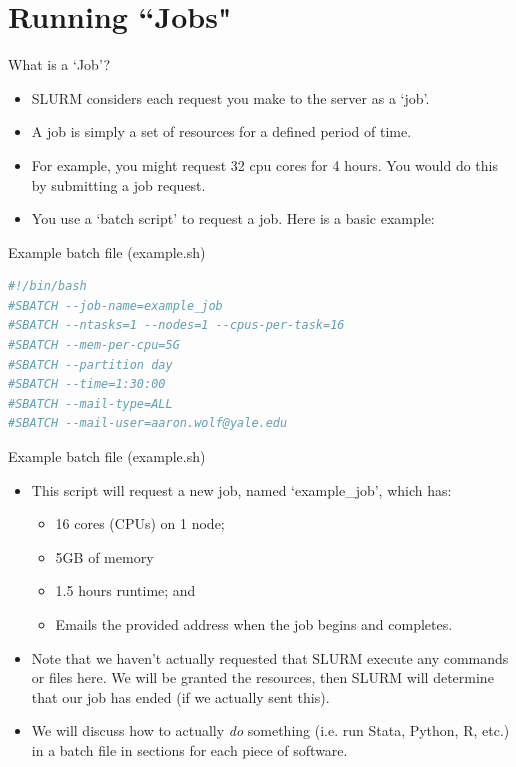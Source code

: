 \documentclass[10pt,xcolor={svgnames}]{beamer}
\begin{document}
\section{Running ``Jobs"}

\begin{frame}{What is a `Job'?}
\begin{itemize}
	\item SLURM considers each request you make to the server as a `job'.
	\item A job is simply a set of resources for a defined period of time. 
	\item For example, you might request 32 cpu cores for 4 hours. You would do this by submitting a job request.
	\item You use a `batch script' to request a job. Here is a basic example:
\end{itemize}
\end{frame}

\begin{frame}[fragile]{Example batch file (example.sh)}
\begin{lstlisting}[language=bash,style=bash,caption={General Batch Script Example}]
#!/bin/bash
#SBATCH --job-name=example_job
#SBATCH --ntasks=1 --nodes=1 --cpus-per-task=16
#SBATCH --mem-per-cpu=5G
#SBATCH --partition day
#SBATCH --time=1:30:00
#SBATCH --mail-type=ALL
#SBATCH --mail-user=aaron.wolf@yale.edu
\end{lstlisting}
\end{frame}

\begin{frame}[fragile]{Example batch file (example.sh)}
\begin{itemize}
\item This script will request a new job, named `example\_job', which has:
\begin{itemize}
\item 16 cores (CPUs) on 1 node; 
\item 5GB of memory
\item 1.5 hours runtime; and
\item Emails the provided address when the job begins and completes.
\end{itemize} 
\item Note that we haven't actually requested that SLURM execute any commands or files here. We will be granted the resources, then SLURM will determine that our job has ended (if we actually sent this).
\item We will discuss how to actually \textit{do} something (i.e. run Stata, Python, R, etc.) in a batch file in sections for each piece of software.
\end{itemize}
\end{frame}
\end{document}
